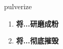
\begin{frame}
{\huge pulverize}
\begin{center}
\begin{enumerate}\Large
  \item \textbf{将...研磨成粉}
  \item \textbf{将...彻底摧毁}
\end{enumerate}
\end{center}
\end{frame}

